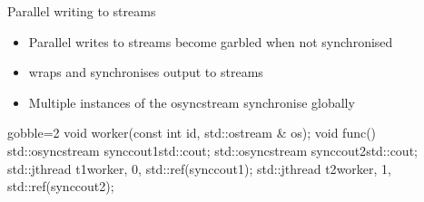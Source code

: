 \begin{frame}[fragile]
  \begin{block}{Parallel writing to streams}
    \begin{itemize}
      \item Parallel writes to streams become garbled when not synchronised
      \item {} wraps and synchronises output to streams
      \item Multiple instances of the osyncstream synchronise globally
    \end{itemize}
  \end{block}
  \begin{exampleblock}{}
    \begin{cppcode*}{gobble=2}
      void worker(const int id, std::ostream & os);
      void func() {
        std::osyncstream synccout1{std::cout};
        std::osyncstream synccout2{std::cout};
        std::jthread t1{worker, 0, std::ref(synccout1)};
        std::jthread t2{worker, 1, std::ref(synccout2)};
      }
    \end{cppcode*}
  \end{exampleblock}
\end{frame}
